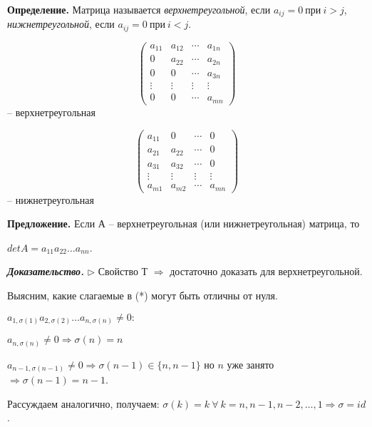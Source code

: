 \vspace{\baselineskip}
\textbf{Определение.} Матрица называется \textit{верхнетреугольной}, если $a_{ij} = 0 \ при \ i > j$, \textit{нижнетреугольной}, если $a_{ij} = 0 \ при \ i < j$. 

\begin{equation*}\begin{pmatrix}
		a_{11} & a_{12} & \cdots & a_{1n} \\
		0 & a_{22} & \cdots & a_{2n} \\
        0 & 0 & \cdots & a_{3n} \\
       \vdots & \vdots & \vdots& \vdots \\ 
       0 & 0 & \cdots & a_{mn}
	\end{pmatrix}
\end{equation*} -- верхнетреугольная 

\begin{equation*}\begin{pmatrix}
		a_{11} & 0 & \cdots & 0 \\
		a_{21} & a_{22} & \cdots & 0 \\
        a_{31} & a_{32} & \cdots & 0 \\
       \vdots & \vdots & \vdots& \vdots \\ 
       a_{m1} & a_{m2} & \cdots & a_{mn}
	\end{pmatrix}
\end{equation*} -- нижнетреугольная 

\vspace{\baselineskip}
\textbf{Предложение.} Если А -- верхнетреугольная (или нижнетреугольная) матрица, то 

$detA = a_{11} a_{22} \dots a_{nn}$.

\vspace{\baselineskip}
\textbf{\textit{Доказательство.}} $\rhd$ Свойство Т $\Rightarrow$ достаточно доказать для верхнетреугольной.

Выясним, какие слагаемые в (*) могут быть отличны от нуля.

$a_{1, \sigma(1)} a_{2, \sigma(2)} \dots a_{n, \sigma(n)} \neq 0:$

$a_{n, \sigma(n)} \neq 0 \Rightarrow \sigma (n) = n$

$a_{n-1, \sigma(n - 1)} \neq 0 \Rightarrow \sigma (n - 1) \in \{n, n - 1 \}$ но $n$ уже занято $\Rightarrow \sigma (n - 1) = n - 1$.

Рассуждаем аналогично, получаем: $\sigma (k) = k \ \forall \ k = n, n-1, n-2, \dots, 1 \Rightarrow \sigma = id$.

